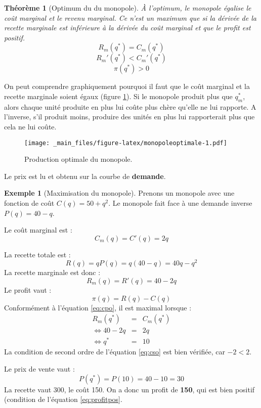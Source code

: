 \documentclass[
]{book}
\newtheorem{theorem}{Théorème}[chapter]
\theoremstyle{definition}
\theoremstyle{definition}
\newtheorem{example}{Exemple}[chapter]
\theoremstyle{definition}
\theoremstyle{definition}
\theoremstyle{remark}
\begin{document}
\begin{theorem}[Optimum du du monopole]
À l'optimum, le monopole égalise le coût marginal et le revenu marginal.
Ce n'est un maximum que si la dérivée de la recette marginale est inférieure à la dérivée du coût marginal et que le profit est positif.
\begin{equation}
R_m(q^*)=C_m(q^*) 
\label{eq:cpo}
\end{equation}
\begin{equation}
R_m'(q^*) <C_m'(q^*) \label{eq:cso}
\end{equation}
\begin{equation}
\pi(q^*)>0 \label{eq:profitpos}
\end{equation}
\end{theorem}

On peut comprendre graphiquement pourquoi il faut que le coût marginal et la recette marginale soient égaux (figure \ref{fig:monopoleoptimale}).
Si le monopole produit plus que \(q_m^*\), alors chaque unité produite en plus lui coûte plus chère qu'elle ne lui rapporte.
A l'inverse, s'il produit moins, produire des unités en plus lui rapporterait plus que cela ne lui coûte.

\begin{figure}
\centering
\texttt{[image: \_main\_files/figure-latex/monopoleoptimale-1.pdf]}
\caption{\label{fig:monopoleoptimale}Production optimale du monopole.}
\end{figure}

Le prix est lu et obtenu sur la courbe de \textbf{demande}.

\begin{example}[Maximisation du monopole]
\protect\hypertarget{exm:monopoleexemple}{}\label{exm:monopoleexemple}Prenons un monopole avec une fonction de coût \(C(q)=50+q^2\).
Le monopole fait face à une demande inverse \(P(q) = 40-q\).

Le coût marginal est :
\[
C_m(q) = C'(q)=2q
\]

La recette totale est :
\[
R(q) = qP(q) = q(40-q) = 40q-q^2
\]
La recette marginale est donc :
\[
R_m(q) = R'(q) = 40 - 2q
\]
Le profit vaut :
\[
\pi(q) = R(q)-C(q)
\]
Conformément à l'équation \eqref{eq:cpo}, il est maximal lorsque :
\[
\begin{array}{rcl}
R_m(q^*) &=&C_m(q^*)\\
\Leftrightarrow 40 -2q &= &2q\\
\Leftrightarrow q^*&=&10
\end{array}
\]
La condition de second ordre de l'équation \eqref{eq:cso} est bien vérifiée, car \(-2<2\).

Le prix de vente vaut :
\[P(q^*) = P(10) = 40-10 = 30\]
La recette vaut 300, le coût 150.
On a donc un profit de \textbf{150}, qui est bien positif (condition de l'équation \eqref{eq:profitpos}.
\end{example}
\end{document}
